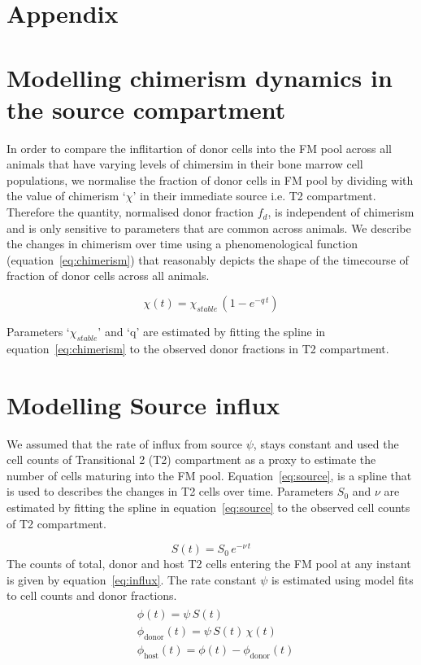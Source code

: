 \documentclass[11.5pt]{article}
\newcommand{\be}{\begin{equation}}
\newcommand{\ee}{\end{equation}}
\newcommand{\bea}{\begin{eqnarray}}
\newcommand{\eea}{\end{eqnarray}}
\begin{document}
\section*{Appendix}
\section*{Modelling chimerism dynamics in the source compartment}
In order to compare the inflitartion of donor cells into the FM pool across all animals that have varying levels of chimersim in their bone marrow cell populations, we normalise the fraction of donor cells in FM pool by dividing with the value of chimerism `$\chi$' in their immediate source i.e. T2 compartment.
Therefore the quantity, normalised donor fraction $f_{d}$, is independent of chimerism and is only sensitive to parameters that are common across animals.
We describe the changes in chimerism over time using a phenomenological function (equation~\ref{eq:chimerism})  that reasonably depicts the shape of the timecourse of fraction of donor cells across all animals.

\be
\chi(t) = \chi_{stable} \, (1 - e^{-q \,t}) 
\label{eq:chimerism}
\ee

Parameters `$\chi_{stable}$' and `q' are estimated by fitting the spline in equation~\ref{eq:chimerism} to the observed donor fractions in T2 compartment.


\section*{Modelling Source influx}
We assumed that the rate of influx from source $\psi$, stays constant and used the cell counts of Transitional 2 (T2) compartment as a proxy to estimate the number of cells maturing into the FM pool.  
Equation~\ref{eq:source}, is a spline that is used to describes the changes in T2 cells over time. 
Parameters $S_0$ and $\nu$ are estimated by fitting the spline in equation~\ref{eq:source} to the observed cell counts of T2 compartment.

\be
S(t) = S_0 \, e^{-\nu \, t}
\label{eq:source}
\ee
The counts of total, donor and host T2 cells entering the FM pool at any instant is given by equation~\ref{eq:influx}. The rate constant $\psi$ is estimated using model fits to cell counts and donor fractions.
\bea
\begin{aligned}
&\phi(t) = \psi \, S(t) \\
&\phi_{\text{donor}}(t) = \psi \, S(t) \, \chi(t)   \\
&\phi_{\text{host}}(t) = \phi(t) - \phi_{\text{donor}}(t) 
\end{aligned}
\label{eq:influx}
\eea
\end{document}
